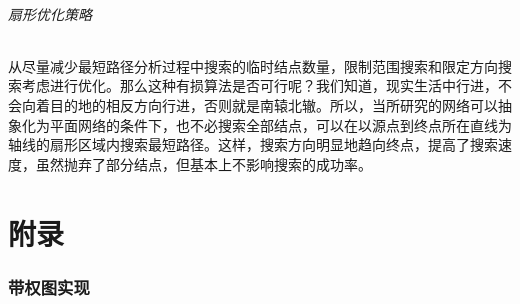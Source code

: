\documentclass[a4paper,10pt]{ctexart}
\begin{document}
\paragraph{扇形优化策略}
从尽量减少最短路径分析过程中搜索的临时结点数量，限制范围搜索和限定方向搜索考虑进行优化。那么这种有损算法是否可行呢？我们知道，现实生活中行进，不会向着目的地的相反方向行进，否则就是南辕北辙。所以，当所研究的网络可以抽象化为平面网络的条件下，也不必搜索全部结点，可以在以源点到终点所在直线为轴线的扇形区域内搜索最短路径。这样，搜索方向明显地趋向终点，提高了搜索速度，虽然抛弃了部分结点，但基本上不影响搜索的成功率。

\newpage
\appendix
\part{附录}
\section{带权图实现}
\label{数据结构如下}
\end{document}
